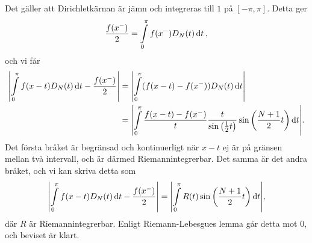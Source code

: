 Det gäller att Dirichletkärnan är jämn och integreras till $1$ på $[-\pi, \pi]$. Detta ger
\begin{align*}
	\frac{f(x^{-})}{2} = \int\limits_{0}^{\pi}f(x^{-})D_{N}(t)\dd{t},
\end{align*}
och vi får
\begin{align*}
	\abs{\int\limits_{0}^{\pi}f(x - t)D_{N}(t)\dd{t} - \frac{f(x^{-})}{2}} &= \abs{\int\limits_{0}^{\pi}(f(x - t) - f(x^{-}))D_{N}(t)\dd{t}} \\
	                                                                 &= \abs{\int\limits_{0}^{\pi}\frac{f(x - t) - f(x^{-})}{t}\frac{t}{\sin{\left(\frac{1}{2}t\right)}}\sin{\left(\frac{N + 1}{2}t\right)}\dd{t}}.
\end{align*}
Det första bråket är begränsad och kontinuerligt när $x - t$ ej är på gränsen mellan två intervall, och är därmed Riemannintegrerbar. Det samma är det andra bråket, och vi kan skriva detta som
\begin{align*}
	\abs{\int\limits_{0}^{\pi}f(x - t)D_{N}(t)\dd{t} - \frac{f(x^{-})}{2}} = \abs{\int\limits_{0}^{\pi}R(t)\sin{\left(\frac{N + 1}{2}t\right)}\dd{t}},
\end{align*}
där $R$ är Riemannintegrerbar. Enligt Riemann-Lebesgues lemma går detta mot $0$, och beviset är klart.